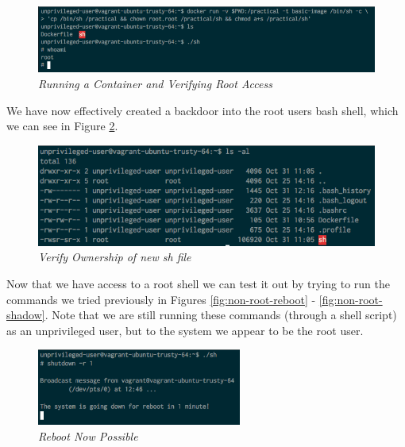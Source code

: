 \documentclass{article}
\begin{document}
\begin{figure}[!h]
\centering
\includegraphics*[width=\textwidth]{components/images/run-container-whoami}
\caption{\em Running a Container and Verifying Root Access}
\label{fig:run-container-whoami}
\end{figure}

We have now effectively created a backdoor into the root users bash shell, which we can see in Figure \ref{fig:verify-ownership}.

\begin{figure}[!h]
\centering
\includegraphics*[width=\textwidth]{components/images/verify-ownership}
\caption{\em Verify Ownership of new sh file}
\label{fig:verify-ownership}
\end{figure}

Now that we have access to a root shell we can test it out by trying to run the commands we tried previously in Figures \ref{fig:non-root-reboot} - \ref{fig:non-root-shadow}. Note that we are still running these commands (through a shell script) as an unprivileged user, but to the system we appear to be the root user. \newline \newline \newline

\begin{figure}[!h]
\centering
\includegraphics*[width=0.6\textwidth]{components/images/root-reboot}
\caption{\em Reboot Now Possible}
\label{fig:root-reboot}
\end{figure}
\end{document}
